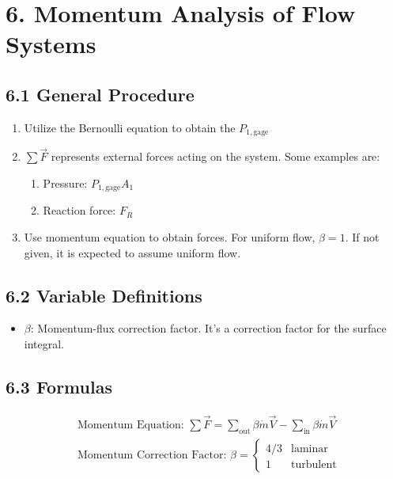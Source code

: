 \section*{6. Momentum Analysis of Flow Systems}
\subsection*{6.1 General Procedure}
\begin{enumerate}
    \item Utilize the Bernoulli equation to obtain the $P_{1, \text{gage}}$
    \item $\sum \vec{F}$ represents external forces acting on the system. Some examples are:
    \begin{enumerate}[label=\roman*)]
        \item Pressure: $P_{1, \text{gage}} A_1$
        \item Reaction force: $F_{R}$
    \end{enumerate}
    \item Use momentum equation to obtain forces. For uniform flow, $\beta = 1$.  If not given, 
    it is expected to assume uniform flow.
\end{enumerate}

\subsection*{6.2 Variable Definitions}
\begin{itemize}
    \item $\beta$: Momentum-flux correction factor. It's a correction factor for the surface integral.
\end{itemize}

\subsection*{6.3 Formulas}
\begin{fleqn}
    \begin{align*}
        &\text{Momentum Equation: } \sum \vec{F} = \sum_{\text{out}} \beta \dot{m} \vec{V} - \sum_{\text{in}} \beta \dot{m} \vec{V} \\
        &\text{Momentum Correction Factor: } \beta = \begin{cases}
            4/3 & \text{laminar} \\
            1 & \text{turbulent}
        \end{cases} \\ 
    \end{align*}
\end{fleqn}
